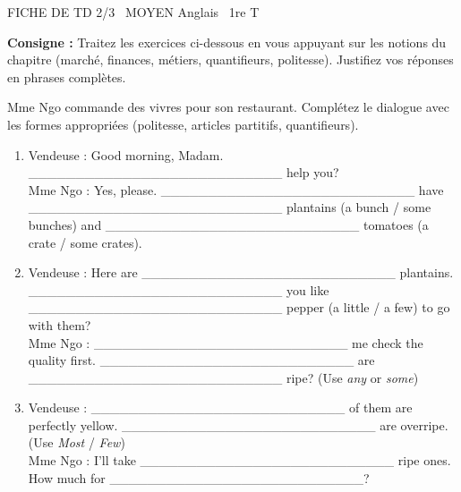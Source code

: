\documentclass[11pt]{article}
\begin{document}
\begin{tcolorbox}[enhanced,colback=popink,colframe=popink,arc=10pt,boxrule=0pt,left=12pt,right=12pt,top=9pt,bottom=9pt]
{\color{white}\popxbold\small FICHE DE TD 2/3 \textbullet\ MOYEN \hfill Anglais \textbullet\ 1re T\par}
\end{tcolorbox}
\vspace{4pt}
\noindent \textbf{Consigne :} Traitez les exercices ci-dessous en vous appuyant sur les notions du chapitre (marché, finances, métiers, quantifieurs, politesse). Justifiez vos réponses en phrases complètes.

\begin{exercice}
Mme Ngo commande des vivres pour son restaurant. Complétez le dialogue avec les formes appropriées (politesse, articles partitifs, quantifieurs).
\begin{enumerate}
    \item Vendeuse : Good morning, Madam. \_\_\_\_\_\_\_\_\_\_\_\_\_\_\_\_\_\_\_\_\_\_\_\_\_\_\_ help you? \\
    Mme Ngo : Yes, please. \_\_\_\_\_\_\_\_\_\_\_\_\_\_\_\_\_\_\_\_\_\_\_\_\_\_\_ have \_\_\_\_\_\_\_\_\_\_\_\_\_\_\_\_\_\_\_\_\_\_\_\_\_\_\_ plantains (a bunch / some bunches) and \_\_\_\_\_\_\_\_\_\_\_\_\_\_\_\_\_\_\_\_\_\_\_\_\_\_\_ tomatoes (a crate / some crates).
    \item Vendeuse : Here are \_\_\_\_\_\_\_\_\_\_\_\_\_\_\_\_\_\_\_\_\_\_\_\_\_\_\_ plantains. \_\_\_\_\_\_\_\_\_\_\_\_\_\_\_\_\_\_\_\_\_\_\_\_\_\_\_ you like \_\_\_\_\_\_\_\_\_\_\_\_\_\_\_\_\_\_\_\_\_\_\_\_\_\_\_ pepper (a little / a few) to go with them? \\
    Mme Ngo : \_\_\_\_\_\_\_\_\_\_\_\_\_\_\_\_\_\_\_\_\_\_\_\_\_\_\_ me check the quality first. \_\_\_\_\_\_\_\_\_\_\_\_\_\_\_\_\_\_\_\_\_\_\_\_\_\_\_ are \_\_\_\_\_\_\_\_\_\_\_\_\_\_\_\_\_\_\_\_\_\_\_\_\_\_\_ ripe? (Use \textit{any} or \textit{some})
    \item Vendeuse : \_\_\_\_\_\_\_\_\_\_\_\_\_\_\_\_\_\_\_\_\_\_\_\_\_\_\_ of them are perfectly yellow. \_\_\_\_\_\_\_\_\_\_\_\_\_\_\_\_\_\_\_\_\_\_\_\_\_\_\_ are overripe. (Use \textit{Most} / \textit{Few}) \\
    Mme Ngo : I'll take \_\_\_\_\_\_\_\_\_\_\_\_\_\_\_\_\_\_\_\_\_\_\_\_\_\_\_ ripe ones. How much for \_\_\_\_\_\_\_\_\_\_\_\_\_\_\_\_\_\_\_\_\_\_\_\_\_\_\_?
\end{enumerate}
\end{exercice}
\end{document}
